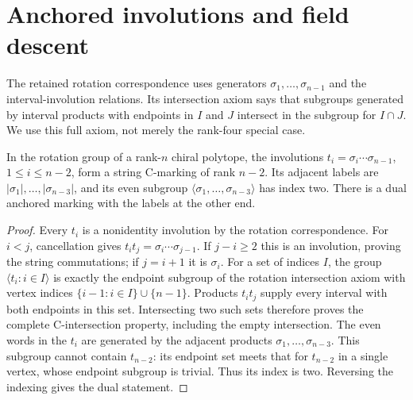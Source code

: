 \section{Anchored involutions and field descent}
The retained rotation correspondence uses generators
$\sigma_1,\ldots,\sigma_{n-1}$ and the interval-involution relations.
Its intersection axiom says that subgroups generated by interval products
with endpoints in $I$ and $J$ intersect in the subgroup for $I\cap J$.
We use this full axiom, not merely the rank-four special case.

\begin{lemma}\label{E.Anchored}
In the rotation group of a rank-$n$ chiral polytope, the involutions
$t_i=\sigma_i\cdots\sigma_{n-1}$, $1\le i\le n-2$, form a string
C-marking of rank $n-2$. Its adjacent labels are
$|\sigma_1|,\ldots,|\sigma_{n-3}|$, and its even subgroup
$\langle\sigma_1,\ldots,\sigma_{n-3}\rangle$ has index two.
There is a dual anchored marking with the labels at the other end.
\end{lemma}
\begin{proof}
Every $t_i$ is a nonidentity involution by the rotation correspondence.
For $i<j$, cancellation gives $t_it_j=\sigma_i\cdots\sigma_{j-1}$.
If $j-i\ge2$ this is an involution, proving the string commutations;
if $j=i+1$ it is $\sigma_i$. For a set of indices $I$, the group
$\langle t_i:i\in I\rangle$ is exactly the endpoint subgroup of the
rotation intersection axiom with vertex indices
$\{i-1:i\in I\}\cup\{n-1\}$. Products $t_it_j$ supply every
interval with both endpoints in this set. Intersecting two such sets
therefore proves the complete C-intersection property, including the
empty intersection. The even words in the $t_i$ are generated by the
adjacent products $\sigma_1,\ldots,\sigma_{n-3}$. This subgroup cannot
contain $t_{n-2}$: its endpoint set meets that for $t_{n-2}$ in a single
vertex, whose endpoint subgroup is trivial. Thus its index is two.
Reversing the indexing gives the dual statement.
\end{proof}

